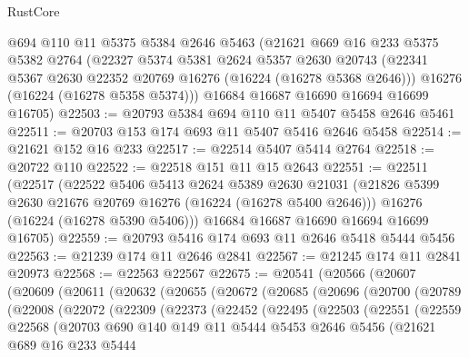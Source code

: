\begin{lexlean}{RustCore}
\begin{coremodule}
    @694
    @110
    @11
    @5375
    @5384
    @2646
    @5463
    (@21621
      @669
      @16
      @233
      @5375
      @5382
      @2764
      (@22327
        @5374
        @5381
        @2624
        @5357
        @2630
        @20743
        (@22341 @5367 @2630 @22352 @20769 @16276 (@16224 (@16278 @5368 @2646)))
        @16276
        (@16224 (@16278 @5358 @5374)))
      @16684
      @16687
      @16690
      @16694
      @16699
      @16705)
@22503 := @20793 @5384 @694 @110 @11 @5407 @5458 @2646 @5461
@22511 := @20703 @153 @174 @693 @11 @5407 @5416 @2646 @5458
@22514 := @21621 @152 @16 @233
@22517 := @22514 @5407 @5414 @2764
@22518 := @20722 @110
@22522 := @22518 @151 @11 @15 @2643
@22551 := @22511
    (@22517
      (@22522
        @5406
        @5413
        @2624
        @5389
        @2630
        @21031
        (@21826 @5399 @2630 @21676 @20769 @16276 (@16224 (@16278 @5400 @2646)))
        @16276
        (@16224 (@16278 @5390 @5406)))
      @16684
      @16687
      @16690
      @16694
      @16699
      @16705)
@22559 := @20793 @5416 @174 @693 @11 @2646 @5418 @5444 @5456
@22563 := @21239 @174 @11 @2646 @2841
@22567 := @21245 @174 @11 @2841 @20973
@22568 := @22563 @22567
@22675 := @20541
    (@20566
      (@20607
        (@20609
          (@20611
            (@20632
              (@20655
                (@20672
                  (@20685
                    (@20696
                      (@20700
                        (@20789
                          (@22008
                            (@22072
                              (@22309
                                (@22373
                                  (@22452
                                    (@22495
                                      (@22503
                                        (@22551
                                          (@22559
                                            @22568
                                            (@20703
                                              @690
                                              @140
                                              @149
                                              @11
                                              @5444
                                              @5453
                                              @2646
                                              @5456
                                              (@21621
                                                @689
                                                @16
                                                @233
                                                @5444

\end{coremodule}
\end{lexlean}
